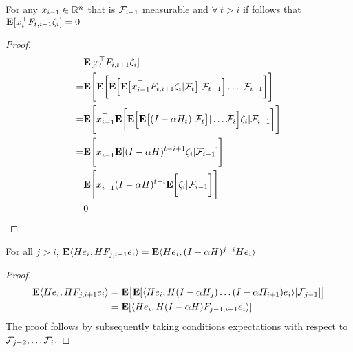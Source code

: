 \begin{lemma}\label{noisecancel}
For any $x_{i-1}\in \mathbb{R}^n$ that is $\mathcal{F}_{i-1}$ measurable and $\forall ~t > i$ if follows that $\mathbf{E}[x_i^\top F_{t,i+1}\zeta_{i}]=0$
\end{lemma}
\small
\begin{proof}
\begin{align*}
&\mathbf{E}[x_t^\top F_{i,t+1}\zeta_{i}]\\
=&\mathbf{E}\Bigg[\mathbf{E}\bigg[\mathbf{E}\Big[\mathbf{E}\big[ x_{i-1}^\top F_{t,i+1}\zeta_{i}|\mathcal{F}_{t}\big]|\mathcal{F}_{t-1}\Big]\ldots|\mathcal{F}_{i-1}\bigg]\Bigg]\\
=&\mathbf{E}\Bigg[ x_{i-1}^\top \mathbf{E}\bigg[\mathbf{E}\Big[\mathbf{E}\big[(I-\alpha H_t)|\mathcal{F}_{t}\big]|\ldots \mathcal{F}_{i}\Big]\zeta_{i}|\mathcal{F}_{i-1}\bigg]\Bigg]\\
=&\mathbf{E}\Bigg[ x_{i-1}^\top \mathbf{E}[(I-\alpha H)^{t-i+1}\zeta_{i}|\mathcal{F}_{i-1}]\Bigg]\\
=&\mathbf{E}\Bigg[ x_{i-1}^\top (I-\alpha H)^{t-i}\mathbf{E}\bigg[\zeta_{i}|\mathcal{F}_{i-1}\bigg]\Bigg]\\
=&0
\end{align*}
\end{proof}
\begin{lemma}\label{unroll}
For all $j>i$, $\mathbf{E} \langle He_i,H F_{j,i+1} e_i\rangle=\mathbf{E}\langle He_i,(I-\alpha H)^{j-i}H e_i\rangle$
\end{lemma}
\begin{proof}
\begin{align}
\mathbf{E} \langle He_i,H F_{j,i+1} e_i\rangle&=\mathbf{E}\big[ \mathbf{E}[\langle He_i,H (I-\alpha H_j)\ldots (I-\alpha H_{i+1} ) e_i\rangle|\mathcal{F}_{j-1}]\big]\\
&=\mathbf{E}[\langle He_i,H (I-\alpha H)F_{j-1,i+1} e_i\rangle]
\end{align}
The proof follows by subsequently taking conditions expectations with respect to $\mathcal{F}_{j-2},\ldots \mathcal{F}_{i}$.
\end{proof}

